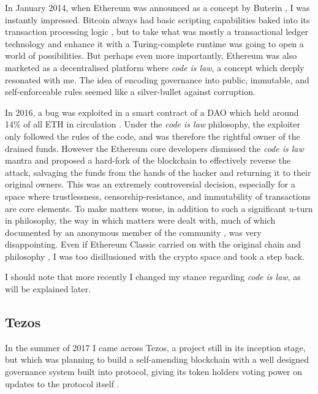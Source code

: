 In January 2014, when Ethereum was announced as a concept by Buterin \citeyear{buterinEthereumNextGenerationCryptocurrency2014}, I was instantly impressed. Bitcoin always had basic scripting capabilities baked into its transaction processing logic \cite{ScriptBitcoinWiki2024}, but to take what was mostly a transactional ledger technology and enhance it with a Turing-complete runtime was going to open a world of possibilities. But perhaps even more importantly, Ethereum was also marketed as a decentralised platform where \emph{\gls{code is law}}, a concept which deeply resonated with me. The idea of encoding governance into public, immutable, and self-enforceable rules seemed like a silver-bullet against corruption.

In 2016, a bug was exploited in a smart contract of a DAO which held around 14\% of all ETH in circulation \cite{morrisCoinDeskTurns102023}. Under the \emph{code is law} philosophy, the exploiter only followed the rules of the code, and was therefore the rightful owner of the drained funds. However the Ethereum core developers dismissed the \emph{code is law} mantra and proposed a hard-fork of the blockchain \cite{buterinCRITICALUPDATERe2016} to effectively reverse the attack, salvaging the funds from the hands of the hacker and returning it to their original owners. This was an extremely controversial decision, especially for a space where trustlessness, censorship-resistance, and immutability of transactions are core elements. To make matters worse, in addition to such a significant u-turn in philosophy, the way in which matters were dealt with, much of which documented by an anonymous member of the community \cite{yourstruly1DAOHistoryIt2018}, was very disappointing. Even if Ethereum Classic carried on with the original chain and philosophy \cite{CodeLaw2022}, I was too disillusioned with the crypto space and took a step back.

I should note that more recently I changed my stance regarding \emph{code is law}, as will be explained later.


\subsection{Tezos}

In the summer of 2017 I came across Tezos, a project still in its inception stage, but which was planning to build a self-amending blockchain with a well designed governance system built into protocol, giving its token holders voting power on updates to the protocol itself \cite{goodmanTezosSelfamendingCryptoledger2014a} . 


